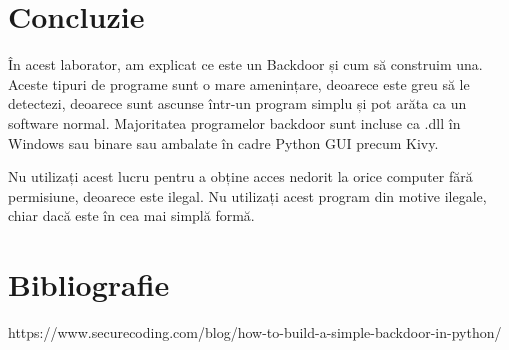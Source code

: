 \documentclass[oneside,20pt]{article}          %
\begin{document}
 

\section{Concluzie}
În acest laborator, am explicat ce este un Backdoor și cum să construim una. Aceste tipuri de programe sunt o mare amenințare, deoarece este greu să le detectezi, deoarece sunt ascunse într-un program simplu și pot arăta ca un software normal. Majoritatea programelor backdoor sunt incluse ca .dll în Windows sau binare sau ambalate în cadre Python GUI precum Kivy.

Nu utilizați acest lucru pentru a obține acces nedorit la orice computer fără permisiune, deoarece este ilegal. Nu utilizați acest program din motive ilegale, chiar dacă este în cea mai simplă formă.
\section{Bibliografie}

https://www.securecoding.com/blog/how-to-build-a-simple-backdoor-in-python/
\end{document}
